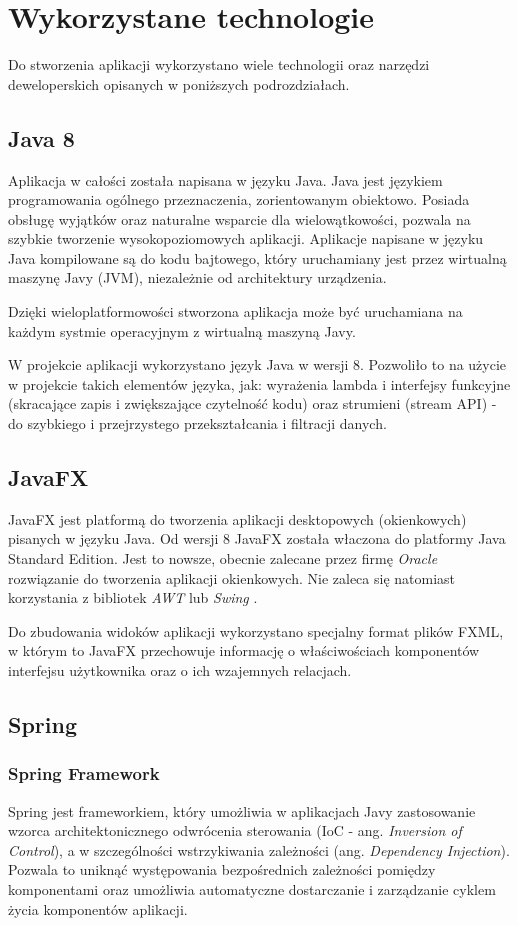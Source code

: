 \section{Wykorzystane technologie}
Do stworzenia aplikacji wykorzystano wiele technologii oraz narzędzi deweloperskich opisanych w poniższych podrozdziałach.

\subsection{Java 8}
Aplikacja w całości została napisana w języku Java.
Java jest językiem programowania ogólnego przeznaczenia, zorientowanym obiektowo. Posiada obsługę wyjątków oraz naturalne wsparcie dla wielowątkowości, pozwala na szybkie tworzenie wysokopoziomowych aplikacji. Aplikacje napisane w języku Java kompilowane są do kodu bajtowego, który uruchamiany jest przez wirtualną maszynę Javy (JVM), niezależnie od architektury urządzenia.

Dzięki wieloplatformowości stworzona aplikacja może być uruchamiana na każdym systmie operacyjnym z wirtualną maszyną Javy.

W projekcie aplikacji wykorzystano język Java w wersji 8. 
Pozwoliło to na użycie w projekcie takich elementów języka, jak: wyrażenia lambda i interfejsy funkcyjne (skracające zapis i zwiększające czytelność kodu) oraz strumieni (stream API) - do szybkiego i przejrzystego przekształcania i filtracji danych.

\subsection{JavaFX}
JavaFX jest platformą do tworzenia aplikacji desktopowych (okienkowych) pisanych w języku Java.
Od wersji 8 JavaFX została właczona do platformy Java Standard Edition.
Jest to nowsze, obecnie zalecane przez firmę {\it Oracle} rozwiązanie do tworzenia aplikacji okienkowych. Nie zaleca się natomiast korzystania z bibliotek {\it AWT} lub {\it Swing} \cite{javafx-replacing-swing}.

Do zbudowania widoków aplikacji wykorzystano specjalny format plików FXML, w którym to JavaFX przechowuje informację o właściwościach komponentów interfejsu użytkownika oraz o ich wzajemnych relacjach.

\subsection{Spring}
\subsubsection{Spring Framework}
Spring jest frameworkiem, który umożliwia w aplikacjach Javy zastosowanie wzorca architektonicznego odwrócenia sterowania (IoC - ang. {\it Inversion of Control}), a w szczególności wstrzykiwania zależności (ang. {\it Dependency Injection}). Pozwala to uniknąć występowania bezpośrednich zależności pomiędzy komponentami oraz umożliwia automatyczne dostarczanie i zarządzanie cyklem życia komponentów aplikacji.

